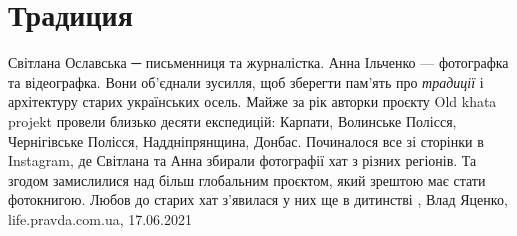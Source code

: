  
 
 
 
 
\chapter{Традиция}

Світлана Ославська ─ письменниця та журналістка. Анна Ільченко — фотографка та
відеографка. Вони об’єднали зусилля, щоб зберегти пам’ять про \emph{традиції} і
архітектуру старих українських осель.  Майже за рік авторки проєкту Old khata
projekt провели близько десяти експедицій: Карпати, Волинське Полісся,
Чернігівське Полісся, Наддніпрянщина, Донбас.  Починалося все зі сторінки в
Instagram, де Світлана та Анна збирали фотографії хат з різних регіонів. Та
згодом замислилися над більш глобальним проєктом, який зрештою має стати
фотокнигою. Любов до старих хат з’явилася у них ще в дитинстві
, 
Влад Яценко, life.pravda.com.ua, 17.06.2021

